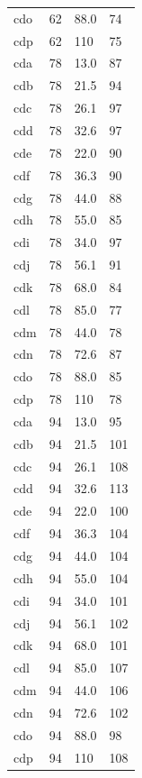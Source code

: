 \documentclass[draft]{agujournal2019}
\begin{document}
\begin{longtable}{A{0.13} B{0.12} B{0.12} B{0.10}}
 cdo        & 62         & 88.0       & 74    \\
 cdp        & 62         & 110        & 75    \\
 cda        & 78         & 13.0       & 87    \\
 cdb        & 78         & 21.5       & 94    \\
 cdc        & 78         & 26.1       & 97    \\
 cdd        & 78         & 32.6       & 97    \\
 cde        & 78         & 22.0       & 90    \\
 cdf        & 78         & 36.3       & 90    \\
 cdg        & 78         & 44.0       & 88    \\
 cdh        & 78         & 55.0       & 85    \\
 cdi        & 78         & 34.0       & 97    \\
 cdj        & 78         & 56.1       & 91    \\
 cdk        & 78         & 68.0       & 84    \\
 cdl        & 78         & 85.0       & 77    \\
 cdm        & 78         & 44.0       & 78    \\
 cdn        & 78         & 72.6       & 87    \\
 cdo        & 78         & 88.0       & 85    \\
 cdp        & 78         & 110        & 78    \\
 cda        & 94         & 13.0       & 95    \\
 cdb        & 94         & 21.5       & 101   \\
 cdc        & 94         & 26.1       & 108   \\
 cdd        & 94         & 32.6       & 113   \\
 cde        & 94         & 22.0       & 100   \\
 cdf        & 94         & 36.3       & 104   \\
 cdg        & 94         & 44.0       & 104   \\
 cdh        & 94         & 55.0       & 104   \\
 cdi        & 94         & 34.0       & 101   \\
 cdj        & 94         & 56.1       & 102   \\
 cdk        & 94         & 68.0       & 101   \\
 cdl        & 94         & 85.0       & 107   \\
 cdm        & 94         & 44.0       & 106   \\
 cdn        & 94         & 72.6       & 102   \\
 cdo        & 94         & 88.0       & 98    \\
 cdp        & 94         & 110        & 108   \\
\end{longtable}
\end{document}
